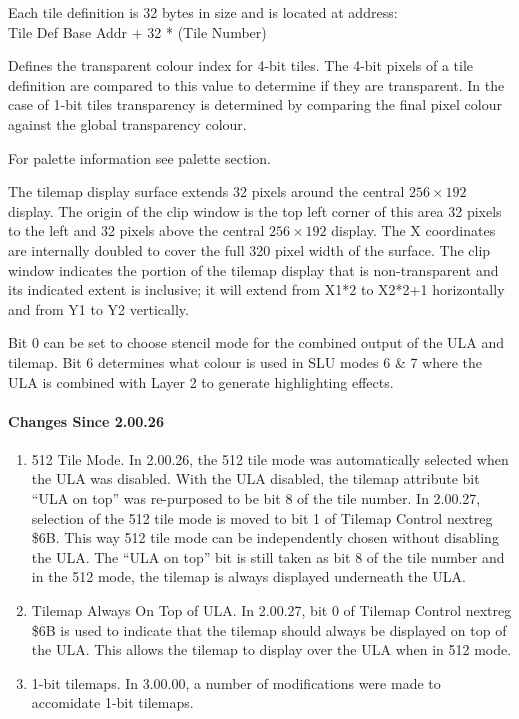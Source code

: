 Each tile definition is 32 bytes in size and is located at address:\\
Tile Def Base Addr + 32 * (Tile Number)



Defines the transparent colour index for 4-bit tiles. The 4-bit pixels
of a tile definition are compared to this value to determine if they
are transparent. In the case of 1-bit tiles transparency is determined
by comparing the final pixel colour against the global transparency
colour.

For palette information see palette section.



The tilemap display surface extends 32 pixels around the central
$256\times192$ display. The origin of the clip window is the top left
corner of this area 32 pixels to the left and 32 pixels above the
central $256\times192$ display. The X coordinates are internally
doubled to cover the full 320 pixel width of the surface. The clip
window indicates the portion of the tilemap display that is
non-transparent and its indicated extent is inclusive; it will extend
from X1*2 to X2*2+1 horizontally and from Y1 to Y2 vertically.






Bit 0 can be set to choose stencil mode for the combined output of the
ULA and tilemap. Bit 6 determines what colour is used in SLU modes 6 \&
7 where the ULA is combined with Layer 2 to generate highlighting
effects.

\paragraph{Changes Since 2.00.26}

\begin{enumerate}
\item 512 Tile Mode. In 2.00.26, the 512 tile mode was automatically
  selected when the ULA was disabled. With the ULA disabled, the
  tilemap attribute bit “ULA on top” was re-purposed to be bit 8 of
  the tile number. In 2.00.27, selection of the 512 tile mode is moved
  to bit 1 of Tilemap Control nextreg \$6B. This way 512 tile mode can
  be independently chosen without disabling the ULA. The “ULA on top”
  bit is still taken as bit 8 of the tile number and in the 512 mode,
  the tilemap is always displayed underneath the ULA.
\item Tilemap Always On Top of ULA. In 2.00.27, bit 0 of Tilemap
  Control nextreg \$6B is used to indicate that the tilemap should
  always be displayed on top of the ULA. This allows the tilemap to
  display over the ULA when in 512 mode.
\item 1-bit tilemaps. In 3.00.00, a number of modifications were made
  to accomidate 1-bit tilemaps.
\end{enumerate}

